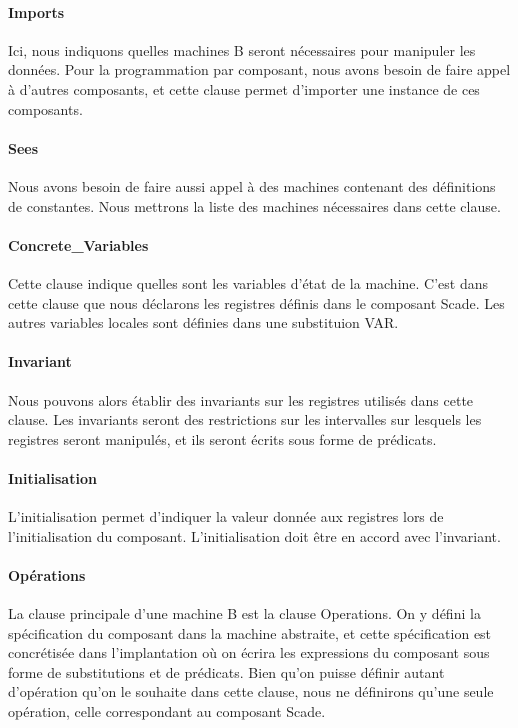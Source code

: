 \paragraph{Imports}
Ici, nous indiquons quelles machines B seront nécessaires pour
manipuler les données. Pour la programmation par composant, nous avons
besoin de faire appel à d'autres composants, et cette clause permet
d'importer une instance de ces composants.

\paragraph{Sees}
Nous avons besoin de faire aussi appel à des machines contenant
des définitions de constantes. Nous mettrons la liste des machines nécessaires
dans cette clause.

\paragraph{Concrete\_Variables}
Cette clause indique quelles sont les variables d'état de la
machine. C'est dans cette clause que nous déclarons les registres
définis dans le composant Scade. Les autres variables locales sont définies dans
une substituion VAR.

\paragraph{Invariant}
Nous pouvons alors établir des invariants sur les registres utilisés
dans cette clause. Les invariants seront des restrictions sur les
intervalles sur lesquels les registres seront manipulés, et ils seront écrits
sous forme de prédicats.

\paragraph{Initialisation}
L'initialisation permet d'indiquer la valeur donnée aux registres lors
de l'initialisation du composant. L'initialisation doit être en accord
avec l'invariant.

\paragraph{Opérations}
La clause principale d'une machine B est la clause Operations. On y
défini la spécification du composant dans la machine abstraite, et
cette spécification est concrétisée dans l'implantation où on écrira
les expressions du composant sous forme de substitutions et de prédicats. Bien
qu'on puisse définir autant d'opération qu'on le souhaite dans cette clause,
nous ne définirons qu'une seule opération, celle correspondant au composant Scade.


